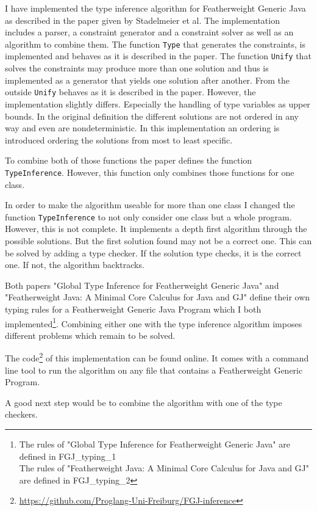 I have implemented the type inference algorithm for Featherweight Generic Java as described in the paper\cite{FGJ} given by Stadelmeier et al.
The implementation includes a parser, a constraint generator and a constraint solver as well as an algorithm to combine them.
The function \verb|Type| that generates the constraints, is implemented and behaves as it is described in the paper.
The function \verb|Unify| that solves the constraints may produce more than one solution and thus is implemented as a generator that
yields one solution after another. From the outside \verb|Unify| behaves as it is described in the paper. However, the implementation slightly
differs. Especially the handling of type variables as upper bounds. In the original definition the different solutions are not ordered in any way
and even are nondeterministic. In this implementation an ordering is introduced ordering the solutions from most to least specific.

To combine both of those functions the paper defines the function\\\verb|TypeInference|. However, this function only combines those functions
for one class.

In order to make the algorithm useable for more than one class I changed the function \verb|TypeInference| to not only consider one class but a whole
program. However, this is not complete. It implements a depth first algorithm through the possible solutions. But the first solution found
may not be a correct one. This can be solved by adding a type checker. If the solution type checks, it is the correct one. If not, the algorithm backtracks.

Both papers "Global Type Inference for Featherweight Generic Java"\cite{FGJ} and "Featherweight Java: A Minimal Core
Calculus for Java and GJ"\cite{FJ} define their own typing rules for a Featherweight Generic Java Program which I both implemented\footnote{The rules of "Global Type Inference for Featherweight Generic Java" are defined in FGJ\_typing\_1\\The rules of "Featherweight Java: A Minimal Core Calculus for Java and GJ" are defined in FGJ\_typing\_2}.
Combining either one with the type inference algorithm imposes different problems which remain to be solved.

The code\footnote{\url{https://github.com/Proglang-Uni-Freiburg/FGJ-inference}} of this implementation can be found online. It comes with a command line tool to run the algorithm on any file that contains a
Featherweight Generic Program.

A good next step would be to combine the algorithm with one of the type checkers.
